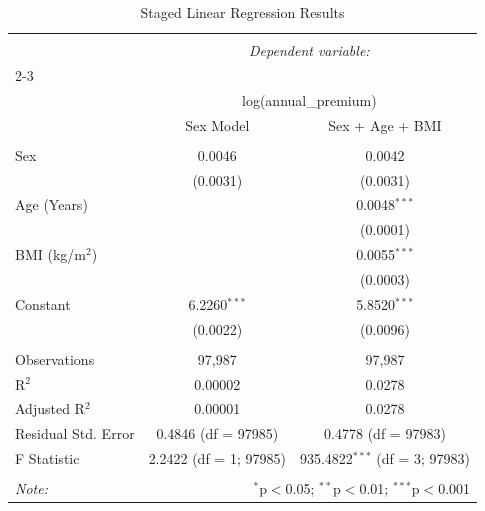 
\begin{table}[!htbp] \centering 
  \caption{Staged Linear Regression Results} 
  \label{} 
\begin{tabular}{@{\extracolsep{5pt}}lcc} 
\\[-1.8ex]\hline 
\hline \\[-1.8ex] 
 & \multicolumn{2}{c}{\textit{Dependent variable:}} \\ 
\cline{2-3} 
\\[-1.8ex] & \multicolumn{2}{c}{log(annual\_premium)} \\ 
 & Sex Model & Sex + Age + BMI \\ 
\hline \\[-1.8ex] 
 Sex & 0.0046 & 0.0042 \\ 
  & (0.0031) & (0.0031) \\ 
  Age (Years) &  & 0.0048$^{***}$ \\ 
  &  & (0.0001) \\ 
  BMI (kg/m$^2$) &  & 0.0055$^{***}$ \\ 
  &  & (0.0003) \\ 
  Constant & 6.2260$^{***}$ & 5.8520$^{***}$ \\ 
  & (0.0022) & (0.0096) \\ 
 \hline \\[-1.8ex] 
Observations & 97,987 & 97,987 \\ 
R$^{2}$ & 0.00002 & 0.0278 \\ 
Adjusted R$^{2}$ & 0.00001 & 0.0278 \\ 
Residual Std. Error & 0.4846 (df = 97985) & 0.4778 (df = 97983) \\ 
F Statistic & 2.2422 (df = 1; 97985) & 935.4822$^{***}$ (df = 3; 97983) \\ 
\hline 
\hline \\[-1.8ex] 
\textit{Note:}  & \multicolumn{2}{r}{$^{*}$p$<$0.05; $^{**}$p$<$0.01; $^{***}$p$<$0.001} \\ 
\end{tabular} 
\end{table} 
